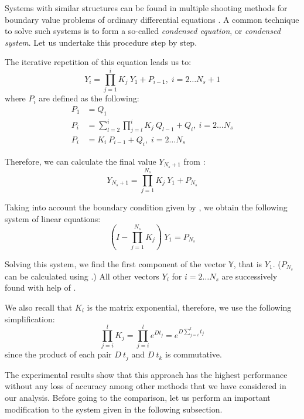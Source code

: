 Systems with similar structures can be found in multiple shooting methods for boundary value problems of ordinary differential equations \cite{stoer2002}. A common technique to solve such systems is to form a so-called \emph{condensed equation}, or \emph{condensed system}. Let us undertake this procedure step by step.

The iterative repetition of this equation leads us to:
\begin{equation} \label{eq:y-recurrent}
  Y_i = \prod_{j = 1}^{i} K_j \: Y_1 + P_{i - 1}, \; i = 2 \dots N_s + 1
\end{equation}
where $P_i$ are defined as the following:
\begin{align}
  P_1 & = Q_1 \nonumber \\
  P_i & = \sum_{l = 2}^i \prod_{j = l}^i K_j \: Q_{l - 1} + Q_i, \: i = 2 \dots N_s \nonumber \\
  P_i & = K_i \: P_{i - 1} + Q_i, \; i = 2 \dots N_s \label{eq:p-recurrent}
\end{align}

Therefore, we can calculate the final value $Y_{N_s + 1}$ from :
\[
  Y_{N_s + 1} = \prod_{j = 1}^{N_s} K_j \: Y_1 + P_{N_s}
\]

Taking into account the boundary condition given by , we obtain the following system of linear equations:
\[
  (I - \prod_{j = 1}^{N_s} K_j) \: Y_1 = P_{N_s}
\]

Solving this system, we find the first component of the vector $\mathbb{Y}$, that is $Y_1$. ($P_{N_s}$ can be calculated using .) All other vectors $Y_i$ for $i = 2 \dots N_s$ are successively found with help of .

We also recall that $K_i$ is the matrix exponential, therefore, we use the following simplification:
\[
  \prod_{j = i}^l K_j = \prod_{j = i}^l e^{D t_j} = e^{D \sum_{j = i}^l t_j}
\]
since the product of each pair $D \: t_j$ and $D \: t_k$ is commutative.

The experimental results show that this approach has the highest performance without any loss of accuracy among other methods that we have considered in our analysis. Before going to the comparison, let us perform an important modification to the system given in the following subsection.

